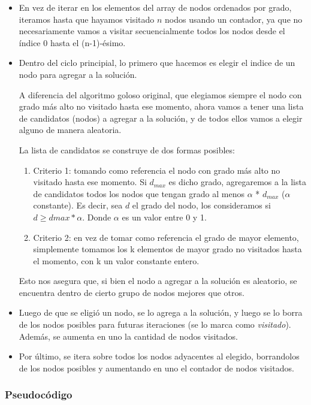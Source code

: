 \begin{itemize}
    \item En vez de iterar en los elementos del array de nodos ordenados por grado, iteramos hasta que hayamos visitado $n$ nodos usando un contador, ya que no necesariamente vamos a visitar secuencialmente todos los nodos desde el índice 0 hasta el (n-1)-ésimo.
    \item Dentro del ciclo principial, lo primero que hacemos es elegir el indice de un nodo para agregar a la solución.

    A diferencia del algoritmo goloso original, que elegiamos siempre el nodo con grado más alto no visitado hasta ese momento, ahora vamos a tener una lista de candidatos (nodos) a agregar a la solución, y de todos ellos vamos a elegir alguno de manera aleatoria.

    La lista de candidatos se construye de dos formas posibles:
    \begin{enumerate}
        \item Criterio 1: tomando como referencia el nodo con grado más alto no visitado hasta ese momento. Si $d_{max}$ es dicho grado, agregaremos a la lista de candidatos todos los nodos que tengan grado al menos $\alpha$ * $d_{max}$ ($\alpha$ constante). Es decir, sea $d$ el grado del nodo, los consideramos si $d \geq d{max} * \alpha$. Donde $\alpha$ es un valor entre 0 y 1.
        \item Criterio 2: en vez de tomar como referencia el grado de mayor elemento, simplemente tomamos los k elementos de mayor grado no visitados hasta el momento, con k un valor constante entero.
    \end{enumerate}

    Esto nos asegura que, si bien el nodo a agregar a la solución es aleatorio, se encuentra dentro de cierto grupo de nodos mejores que otros.

    \item Luego de que se eligió un nodo, se lo agrega a la solución, y luego se lo borra de los nodos posibles para futuras iteraciones (se lo marca como \textit{visitado}). Además, se aumenta en uno la cantidad de nodos visitados.
    \item Por último, se itera sobre todos los nodos adyacentes al elegido, borrandolos de los nodos posibles y aumentando en uno el contador de nodos visitados.
\end{itemize}

\subsubsection{Pseudocódigo}

